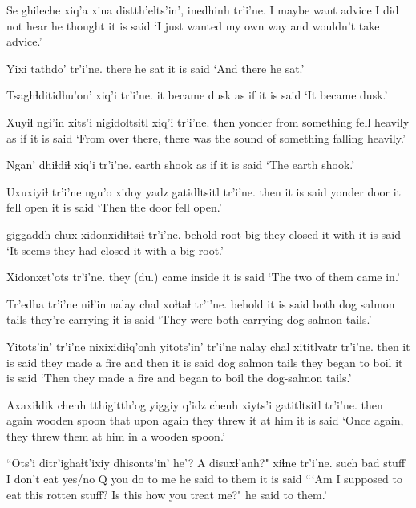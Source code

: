 \documentclass[12pt]{article}
\begin{document}
\gll Se ghileche xiq'a xina {distth'elts'in',} inedhinh tr'i'ne.
I maybe want advice {I did not hear}   {he thought} {it is said}
\glt `I just wanted my own way and wouldn't take advice.'
\glend

\gll Yixi tathdo' tr'i'ne.
there {he sat}  {it is said}
\glt `And there he sat.'
\glend

\gll Tsaghɬditidhu'on' xiq'i tr'i'ne.
{it became dusk} {as if} {it is said}
\glt `It became dusk.'
\glend

\gll Xuyiɬ ngi'in xits'i nigidoɬtsitl  xiq'i tr'i'ne.
then yonder from  {something fell heavily} {as if} {it is said}
\glt `From over there, there was the sound of something falling heavily.'
\glend

\gll Ngan' dhiɬdiɬ xiq'i tr'i'ne.
earth shook  {as if} {it is said}
\glt `The earth shook.'
\glend

\gll Uxuxiyiɬ tr'i'ne ngu'o  xidoy {yadz gatidltsitl} tr'i'ne.
then  {it is said} yonder door  {it fell open}  {it is said}
\glt `Then the door fell open.'
\glend

 giggaddh chux xidonxidiɬtsiɬ  tr'i'ne.
behold root  big {they closed it with} {it is said}
\glt `It seems they had closed it with a big root.'
\glend

\gll Xidonxet'ots tr'i'ne.
{they (du.) came inside} {it is said}
\glt `The two of them came in.'
\glend

\gll Tr'edha tr'i'ne niɬ'in nalay  chal xoɬtaɬ  tr'i'ne.
behold  {it is said} both {dog salmon} tails {they're carrying} {it is said}
\glt `They were both carrying dog salmon tails.'
\glend

\gll Yitots'in' tr'i'ne nixixidiɬq'onh yitots'in' tr'i'ne nalay  chal xititlvatr  tr'i'ne.
then  {it is said} {they made a fire} {and then} {it is said} {dog salmon} tails {they began to boil} {it is said}
\glt `Then they made a fire and began to boil the dog-salmon tails.'
\glend

\gll Axaxiɬdik chenh tthigitth'og yiggiy q'idz chenh {xiyts'i gatitltsitl} tr'i'ne.
then  again {wooden spoon} that upon again {they threw it at him} {it is said}
\glt `Once again, they threw them at him in a wooden spoon.'
\glend

\gll ``Ots'i ditr'ighaɬt'ixiy {dhisonts'in'} he'?  A disuxɬ'anh?" xiɬne   tr'i'ne.
such  {bad stuff}  {I don't eat} {yes/no Q} {} {you do to me} {he said to them} {it is said}
\glt ```Am I supposed to eat this rotten stuff? Is this how you treat me?" he said to them.'
\glend
\end{document}
